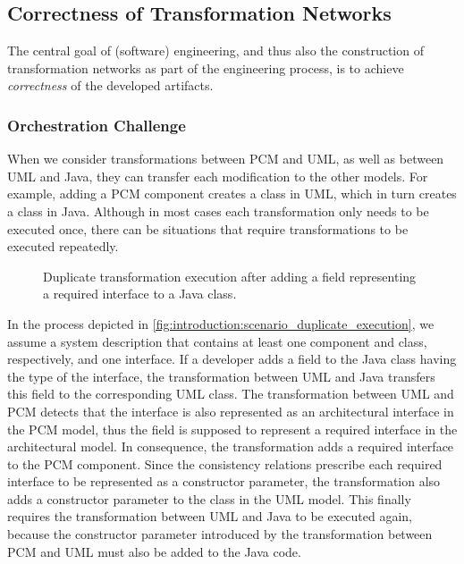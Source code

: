 \subsection{Correctness of Transformation Networks}

The central goal of (software) engineering, and thus also the construction of transformation networks as part of the engineering process, is to achieve \emph{correctness} of the developed artifacts.

\subsubsection*{Orchestration Challenge}
\label{chap:introduction:challenges:correctness:orchestration}

When we consider transformations between \gls{PCM} and \gls{UML}, as well as between \gls{UML} and Java, they can transfer each modification to the other models.
For example, adding a \gls{PCM} component creates a class in \gls{UML}, which in turn creates a class in Java.
Although in most cases each transformation only needs to be executed once, there can be situations that require transformations to be executed repeatedly.

\begin{figure}
    \centering
    
    \caption[Example for transformation orchestration]{Duplicate transformation execution after adding a field representing a required interface to a Java class.}
    \label{fig:introduction:scenario_duplicate_execution}
\end{figure}

In the process depicted in \autoref{fig:introduction:scenario_duplicate_execution}, we assume a system description that contains at least one component and class, respectively, and one interface.
If a developer adds a field to the Java class having the type of the interface, the transformation between \gls{UML} and Java transfers this field to the corresponding \gls{UML} class.
The transformation between \gls{UML} and \gls{PCM} detects that the interface is also represented as an architectural interface in the \gls{PCM} model, thus the field is supposed to represent a required interface in the architectural model.
In consequence, the transformation adds a required interface to the \gls{PCM} component.
Since the consistency relations prescribe each required interface to be represented as a constructor parameter, the transformation also adds a constructor parameter to the class in the \gls{UML} model.
This finally requires the transformation between \gls{UML} and Java to be executed again, because the constructor parameter introduced by the transformation between \gls{PCM} and \gls{UML} must also be added to the Java code.

